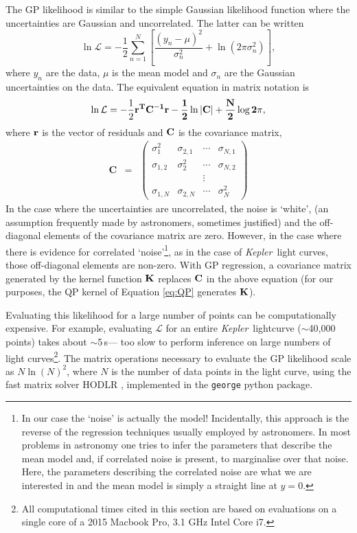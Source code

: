 \documentclass[a4paper,fleqn,usenatbib,useAMS]{mnras}
\newcommand{\Kepler}{{\it Kepler}}
\begin{document}
The GP likelihood is similar to the simple Gaussian likelihood
function where the uncertainties are
Gaussian and uncorrelated. The latter can be written
\begin{equation}
    \ln \mathcal{L} = -\frac{1}{2}\sum_{n=1}^N\left[\frac{(y_n-\mu)^2}{\sigma_n^2}
    + \ln(2\pi\sigma_n^2)\right],
\end{equation}
\label{eq:chi2}
where $y_n$ are the data, $\mu$ is the mean model and $\sigma_n$ are the
Gaussian uncertainties on the data.
The equivalent equation in matrix notation is
\begin{equation}
    \ln \mathcal{L} = -\frac{1}{2}\bf{r}^T\bf{C}^{-1}\bf{r}-\frac{1}{2}\ln|\bf{C}|
    + \frac{N}{2}\log2\pi,
\end{equation}
\label{eq:lhf1}
where $\bf{r}$ is the vector of residuals and $\bf{C}$ is the covariance
matrix,
\begin{eqnarray}
    \mathbf{C} &=& \left (\begin{array}{cccc}
    \sigma^2_1 & \sigma_{2, 1} & \cdots & \sigma_{N, 1} \\
    \sigma_{1, 2} & \sigma^2_2 & \cdots & \sigma_{N, 2} \\
    && \vdots & \\
    \sigma_{1, N} & \sigma_{2, N} & \cdots & \sigma^2_N
\end{array}\right )
\end{eqnarray}
In the case where the uncertainties are uncorrelated, the noise is `white',
(an assumption frequently made by astronomers, sometimes justified)
and the off-diagonal elements of the covariance matrix are zero.
However, in the case where there is evidence for correlated
`noise'\footnote{In our case the `noise' is actually the model!  Incidentally, this approach is the reverse of the regression techniques
usually employed by astronomers.
In most problems in astronomy one tries to infer the parameters that describe
the mean model and, if correlated noise is present, to marginalise over that
noise.
Here, the parameters describing the correlated noise are what we are
interested in and the mean model is simply a straight line at $y=0$.}, as in the
case of \Kepler\ light curves, those off-diagonal elements are non-zero.
With GP regression, a covariance matrix generated by the kernel function
${\bf K}$ replaces ${\bf C}$ in the above equation (for our purposes, the QP
kernel of Equation \ref{eq:QP} generates ${\bf K}$).

Evaluating this likelihood for a large number of points can be computationally
expensive.
For example, evaluating $\mathcal L$ for an entire \Kepler\ lightcurve
($\sim$40,000 points) takes about $\sim$5\,s--- too slow to perform inference
on large numbers of light curves\footnote{All computational times cited in
this section are based on evaluations on a single core of a 2015 Macbook Pro,
3.1 GHz Intel Core i7.}.
The matrix operations necessary to evaluate the GP likelihood scale as
$N\ln(N)^2$, where $N$ is the number of data points in the light curve, using
the fast matrix solver HODLR \citep{Ambikasaran2014},
implemented in the {\tt george} \citep{George} python package.
\end{document}
